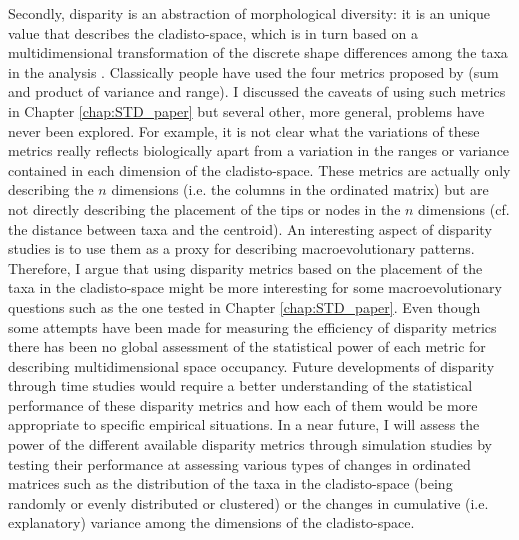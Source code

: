 Secondly, disparity is an abstraction of morphological diversity: it is an unique value that describes the cladisto-space, which is in turn based on a multidimensional transformation of the discrete shape differences among the taxa in the analysis \citep{Wills1994,foote1997evolution}.
Classically people have used the four metrics proposed by \cite{Wills1994} (sum and product of variance and range).
I discussed the caveats of using such metrics in Chapter \ref{chap:STD_paper} but several other, more general, problems have never been explored.
For example, it is not clear what the variations of these metrics really reflects biologically apart from a variation in the ranges or variance contained in each dimension of the cladisto-space.
These metrics are actually only describing the $n$ dimensions (i.e. the columns in the ordinated matrix) but are not directly describing the placement of the tips or nodes in the $n$ dimensions (cf. the distance between taxa and the centroid).
An interesting aspect of disparity studies is to use them as a proxy for describing macroevolutionary patterns.%
Therefore, I argue that using disparity metrics based on the placement of the taxa in the cladisto-space might be more interesting for some macroevolutionary questions such as the one tested in Chapter \ref{chap:STD_paper}.
Even though some attempts have been made for measuring the efficiency of disparity metrics \citep{Ciampaglio2001} there has been no global assessment of the statistical power of each metric for describing multidimensional space occupancy.
Future developments of disparity through time studies would require a better understanding of the statistical performance of these disparity metrics and how each of them would be more appropriate to specific empirical situations.
In a near future, I will assess the power of the different available disparity metrics \citep[e.g.][]{Wills1994,Ciampaglio2004,Hughes20082013,huang2015origins} through simulation studies by testing their performance at assessing various types of changes in ordinated matrices such as the distribution of the taxa in the cladisto-space (being randomly or evenly distributed or clustered) or the changes in cumulative (i.e. explanatory) variance among the dimensions of the cladisto-space.

